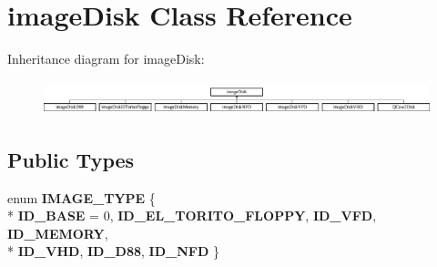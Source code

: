 \hypertarget{classimageDisk}{\section{image\-Disk Class Reference}
\label{classimageDisk}
}
Inheritance diagram for image\-Disk\-:\begin{figure}[H]
\begin{center}
\leavevmode
\includegraphics[height=1.006289cm]{classimageDisk}
\end{center}
\end{figure}
\subsection*{Public Types}
\begin{DoxyCompactItemize}
\item 
enum {\bfseries I\-M\-A\-G\-E\-\_\-\-T\-Y\-P\-E} \{ \\*
{\bfseries I\-D\-\_\-\-B\-A\-S\-E} = 0, 
{\bfseries I\-D\-\_\-\-E\-L\-\_\-\-T\-O\-R\-I\-T\-O\-\_\-\-F\-L\-O\-P\-P\-Y}, 
{\bfseries I\-D\-\_\-\-V\-F\-D}, 
{\bfseries I\-D\-\_\-\-M\-E\-M\-O\-R\-Y}, 
\\*
{\bfseries I\-D\-\_\-\-V\-H\-D}, 
{\bfseries I\-D\-\_\-\-D88}, 
{\bfseries I\-D\-\_\-\-N\-F\-D}
 \}
\end{DoxyCompactItemize}

